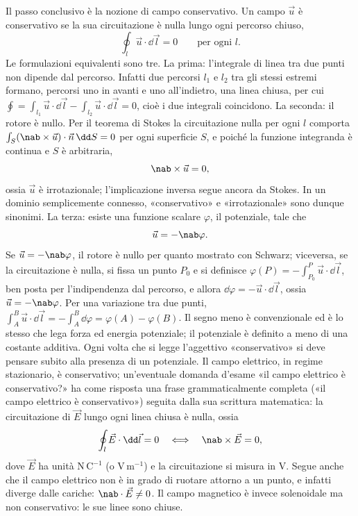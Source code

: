 \documentclass[main.tex]{subfiles}
\begin{document}
Il passo conclusivo è la nozione di campo conservativo. Un campo $\vec u$ è conservativo se la sua circuitazione è nulla lungo ogni percorso chiuso,
\[
\oint_l\vec u\cdot\dd\vec l=0\qquad\text{per ogni }l .
\]
Le formulazioni equivalenti sono tre. La prima: l'integrale di linea tra due punti non dipende dal percorso. Infatti due percorsi $l_1$ e $l_2$ tra gli stessi estremi formano, percorsi uno in avanti e uno all'indietro, una linea chiusa, per cui $\oint=\int_{l_1}\vec u\cdot\dd\vec l-\int_{l_2}\vec u\cdot\dd\vec l=0$, cioè i due integrali coincidono. La seconda: il rotore è nullo. Per il teorema di Stokes la circuitazione nulla per ogni $l$ comporta $\int_S(\nab\times\vec u)\cdot\vec n\,\dd S=0$ per ogni superficie $S$, e poiché la funzione integranda è continua e $S$ è arbitraria,
\[
\nab\times\vec u=0 ,
\]
ossia $\vec u$ è irrotazionale; l'implicazione inversa segue ancora da Stokes. In un dominio semplicemente connesso, «conservativo» e «irrotazionale» sono dunque sinonimi. La terza: esiste una funzione scalare $\varphi$, il potenziale, tale che
\[
\vec u=-\nab\varphi .
\]
Se $\vec u=-\nab\varphi$, il rotore è nullo per quanto mostrato con Schwarz; viceversa, se la circuitazione è nulla, si fissa un punto $P_0$ e si definisce $\varphi(P)=-\int_{P_0}^{P}\vec u\cdot\dd\vec l$, ben posta per l'indipendenza dal percorso, e allora $\dd\varphi=-\vec u\cdot\dd\vec l$, ossia $\vec u=-\nab\varphi$. Per una variazione tra due punti, $\int_A^B\vec u\cdot\dd\vec l=-\int_A^B\dd\varphi=\varphi(A)-\varphi(B)$. Il segno meno è convenzionale ed è lo stesso che lega forza ed energia potenziale; il potenziale è definito a meno di una costante additiva. Ogni volta che si legge l'aggettivo «conservativo» si deve pensare subito alla presenza di un potenziale. Il campo elettrico, in regime stazionario, è conservativo; un'eventuale domanda d'esame «il campo elettrico è conservativo?» ha come risposta una frase grammaticalmente completa («il campo elettrico è conservativo») seguita dalla sua scrittura matematica: la circuitazione di $\vec E$ lungo ogni linea chiusa è nulla, ossia
\[
\oint_l\vec E\cdot\dd\vec l=0\quad\Longleftrightarrow\quad\nab\times\vec E=0 ,
\]
dove $\vec E$ ha unità $\mathrm{N\,C^{-1}}$ (o $\mathrm{V\,m^{-1}}$) e la circuitazione si misura in $\mathrm{V}$. Segue anche che il campo elettrico non è in grado di ruotare attorno a un punto, e infatti diverge dalle cariche: $\nab\cdot\vec E\neq0$. Il campo magnetico è invece solenoidale ma non conservativo: le sue linee sono chiuse.
\end{document}
